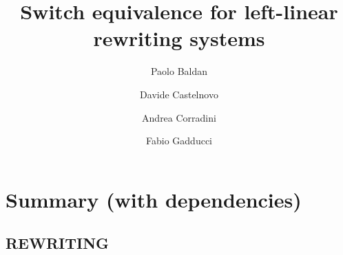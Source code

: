 \documentclass[a4paper,UKenglish,cleveref,pdftex, thm-restate,numberwithinsect]{lipics}
\title{Switch equivalence for left-linear rewriting systems}
\author{Paolo Baldan} 
{Department of Mathematics, University of Padova, Italy}
{baldan@math.unipd.it}{}{}
\author{Davide Castelnovo}
{Department of Mathematics, University of Padova, Italy}
{davide.castelnovo@math.unipd.it}{}{}
\author{Andrea Corradini}
{Department of Computer Science, University of Pisa, Italy}
{andrea.corradini@unipi.it}{}{}
\author{Fabio Gadducci}
{Department of Computer Science, University of Pisa, Italy}
{fabio.gadducci@unipi.it}{}{}
\begin{document}
\maketitle



\begin{abstract}
\end{abstract}


\section*{Summary (with dependencies)}

\subsection*{REWRITING}
\end{document}
